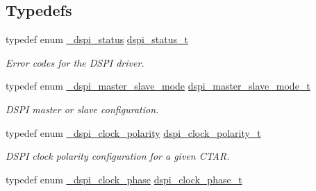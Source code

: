\subsection*{Typedefs}
\begin{DoxyCompactItemize}
\item 
typedef enum \hyperlink{group__dspi__hal_ga06b41ab984bc03e6f1eb07988edcb3ea}{\+\_\+dspi\+\_\+status} \hyperlink{group__dspi__hal_ga22d7dd51eeb108e60311c4139d619e12}{dspi\+\_\+status\+\_\+t}\hypertarget{group__dspi__hal_ga22d7dd51eeb108e60311c4139d619e12}{}\label{group__dspi__hal_ga22d7dd51eeb108e60311c4139d619e12}

\begin{DoxyCompactList}\small\item\em Error codes for the D\+S\+PI driver. \end{DoxyCompactList}\item 
typedef enum \hyperlink{group__dspi__hal_ga22d5d3420ce510463f61e41cbe1d1410}{\+\_\+dspi\+\_\+master\+\_\+slave\+\_\+mode} \hyperlink{group__dspi__hal_gab8a31428154823fb3a47109f79f62269}{dspi\+\_\+master\+\_\+slave\+\_\+mode\+\_\+t}\hypertarget{group__dspi__hal_gab8a31428154823fb3a47109f79f62269}{}\label{group__dspi__hal_gab8a31428154823fb3a47109f79f62269}

\begin{DoxyCompactList}\small\item\em D\+S\+PI master or slave configuration. \end{DoxyCompactList}\item 
typedef enum \hyperlink{group__dspi__hal_ga8324f34ea4af085c11052288fc94983e}{\+\_\+dspi\+\_\+clock\+\_\+polarity} \hyperlink{group__dspi__hal_ga959b683effa08cff187f755506526745}{dspi\+\_\+clock\+\_\+polarity\+\_\+t}\hypertarget{group__dspi__hal_ga959b683effa08cff187f755506526745}{}\label{group__dspi__hal_ga959b683effa08cff187f755506526745}

\begin{DoxyCompactList}\small\item\em D\+S\+PI clock polarity configuration for a given C\+T\+AR. \end{DoxyCompactList}\item 
typedef enum \hyperlink{group__dspi__hal_ga648d70d13ec12505a80c423841f53510}{\+\_\+dspi\+\_\+clock\+\_\+phase} \hyperlink{group__dspi__hal_gace26aa668a9601c9d79bdd5205f37b14}{dspi\+\_\+clock\+\_\+phase\+\_\+t}\hypertarget{group__dspi__hal_gace26aa668a9601c9d79bdd5205f37b14}{}\label{group__dspi__hal_gace26aa668a9601c9d79bdd5205f37b14}


\end{DoxyCompactItemize}
